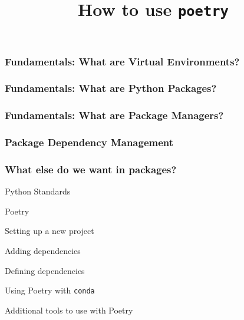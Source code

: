 \documentclass[aspectratio=169]{beamer}
\title{How to use \protect\lstinline!poetry!}
\begin{document}
\maketitle
\begin{frame}
    \frametitle{Fundamentals: What are Virtual Environments?}
\end{frame}
\begin{frame}
    \frametitle{Fundamentals: What are Python Packages?}
\end{frame}
\begin{frame}
    \frametitle{Fundamentals: What are Package Managers?}
\end{frame}
\begin{frame}
    \frametitle{Package Dependency Management}
\end{frame}
\begin{frame}
    \frametitle{What else do we want in packages?}
\end{frame}
\begin{frame}{Python Standards}
    
\end{frame}
\begin{frame}{Poetry}
    
\end{frame}
\begin{frame}{Setting up a new project}
    
\end{frame}
\begin{frame}{Adding dependencies}
    
\end{frame}
\begin{frame}{Defining dependencies}
    
\end{frame}
\begin{frame}{Using Poetry with \protect\lstinline!conda!}
    
\end{frame}
\begin{frame}{Additional tools to use with Poetry}
    
\end{frame}
\end{document}
